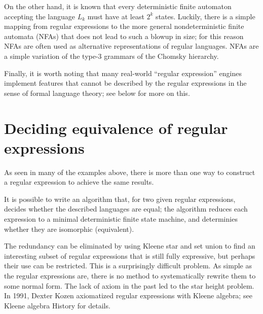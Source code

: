 On the other hand, it is known that every deterministic finite
automaton accepting the language $L_k$ must have at least $2^k$
states. Luckily, there is a simple mapping from regular expressions to
the more general nondeterministic finite automata (NFAs) that does not
lead to such a blowup in size; for this reason NFAs are often used as
alternative representations of regular languages. NFAs are a simple
variation of the type-3 grammars of the Chomsky hierarchy.

Finally, it is worth noting that many real-world ``regular expression''
engines implement features that cannot be described by the regular
expressions in the sense of formal language theory; see below for more
on this.

\section{Deciding equivalence of regular expressions}
As seen in many of the examples above, there is more than one way to
construct a regular expression to achieve the same results.

It is possible to write an algorithm that, for two given regular
expressions, decides whether the described languages are equal; the
algorithm reduces each expression to a minimal deterministic finite
state machine, and determinies whether they are isomorphic
(equivalent).

The redundancy can be eliminated by using Kleene star and set union to
find an interesting subset of regular expressions that is still fully
expressive, but perhaps their use can be restricted. This is a
surprisingly difficult problem. As simple as the regular expressions
are, there is no method to systematically rewrite them to some normal
form. The lack of axiom in the past led to the star height problem. In
1991, Dexter Kozen axiomatized regular expressions with Kleene
algebra; see Kleene algebra History for details.
